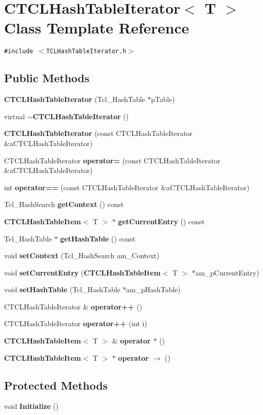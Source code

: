 \section{CTCLHash\-Table\-Iterator$<$ T $>$  Class Template Reference}
\label{classCTCLHashTableIterator}
{\tt \#include $<$TCLHash\-Table\-Iterator.h$>$}

\subsection*{Public Methods}
\begin{CompactItemize}
\item 
{\bf CTCLHash\-Table\-Iterator} (Tcl\_\-Hash\-Table $\ast$p\-Table)
\item 
virtual {\bf $\sim$CTCLHash\-Table\-Iterator} ()
\item 
{\bf CTCLHash\-Table\-Iterator} (const CTCLHash\-Table\-Iterator \&a\-CTCLHash\-Table\-Iterator)
\item 
CTCLHash\-Table\-Iterator {\bf operator=} (const CTCLHash\-Table\-Iterator \&a\-CTCLHash\-Table\-Iterator)
\item 
int {\bf operator==} (const CTCLHash\-Table\-Iterator \&a\-CTCLHash\-Table\-Iterator)
\item 
Tcl\_\-Hash\-Search {\bf get\-Context} () const
\item 
{\bf CTCLHash\-Table\-Item}$<$ T $>$ $\ast$ {\bf get\-Current\-Entry} () const
\item 
Tcl\_\-Hash\-Table $\ast$ {\bf get\-Hash\-Table} () const
\item 
void {\bf set\-Context} (Tcl\_\-Hash\-Search am\_\-Context)
\item 
void {\bf set\-Current\-Entry} ({\bf CTCLHash\-Table\-Item}$<$ T $>$ $\ast$am\_\-p\-Current\-Entry)
\item 
void {\bf set\-Hash\-Table} (Tcl\_\-Hash\-Table $\ast$am\_\-p\-Hash\-Table)
\item 
CTCLHash\-Table\-Iterator \& {\bf operator++} ()
\item 
CTCLHash\-Table\-Iterator {\bf operator++} (int i)
\item 
{\bf CTCLHash\-Table\-Item}$<$ T $>$ \& {\bf operator $\ast$} ()
\item 
{\bf CTCLHash\-Table\-Item}$<$ T $>$ $\ast$ {\bf operator $\rightarrow$ } ()
\end{CompactItemize}
\subsection*{Protected Methods}
\begin{CompactItemize}
\item 
void {\bf Initialize} ()
\end{CompactItemize}
